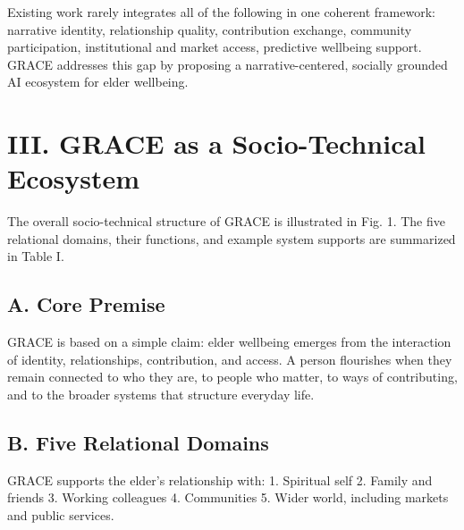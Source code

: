 \documentclass[
  journal,
]{IEEEtran}%
\begin{document}
Existing work rarely integrates all of the following in one coherent
framework: narrative identity, relationship quality, contribution
exchange, community participation, institutional and market access,
predictive wellbeing support. GRACE addresses this gap by proposing a
narrative-centered, socially grounded AI ecosystem for elder wellbeing.

\section{III. GRACE as a Socio-Technical
Ecosystem}\label{iii.-grace-as-a-socio-technical-ecosystem}

The overall socio-technical structure of GRACE is illustrated in Fig. 1.
The five relational domains, their functions, and example system
supports are summarized in Table I.

\subsection{A. Core Premise}\label{a.-core-premise}

GRACE is based on a simple claim: elder wellbeing emerges from the
interaction of identity, relationships, contribution, and access. A
person flourishes when they remain connected to who they are, to people
who matter, to ways of contributing, and to the broader systems that
structure everyday life.

\subsection{B. Five Relational
Domains}\label{b.-five-relational-domains}

GRACE supports the elder's relationship with: 1. Spiritual self 2.
Family and friends 3. Working colleagues 4. Communities 5. Wider world,
including markets and public services.
\end{document}
